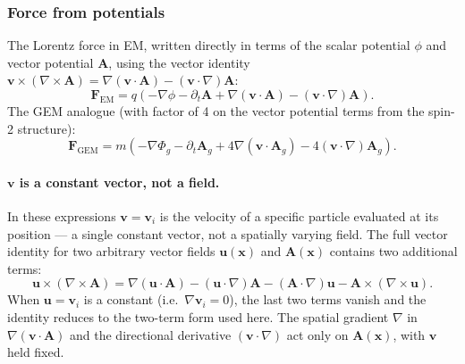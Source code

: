 \documentclass[11pt,a4paper]{article}
\newcommand{\vv}[1]{\mathbf{#1}}
\newcommand{\Phig}{\Phi_g}
\newcommand{\Ag}{\vv{A}_g}
\begin{document}
\subsubsection*{Force from potentials}
\label{sec:force_potential}

The Lorentz force in EM, written directly in terms of the scalar potential $\phi$ and vector potential $\vv{A}$, using the vector identity $\vv{v}\times(\nabla\times\vv{A}) = \nabla(\vv{v}\cdot\vv{A}) - (\vv{v}\cdot\nabla)\vv{A}$:
\begin{equation}
\label{eq:em_force_potential}
  \vv{F}_{\mathrm{EM}} = q\!\left(-\nabla\phi - \partial_t\vv{A} + \nabla(\vv{v}\cdot\vv{A}) - (\vv{v}\cdot\nabla)\vv{A}\right).
\end{equation}
The GEM analogue (with factor of 4 on the vector potential terms from the spin-2 structure):
\begin{equation}
\label{eq:gem_force_potential}
  \vv{F}_{\mathrm{GEM}} = m\!\left(-\nabla\Phig - \partial_t\Ag + 4\nabla(\vv{v}\cdot\Ag) - 4(\vv{v}\cdot\nabla)\Ag\right).
\end{equation}

\paragraph{$\vv{v}$ is a constant vector, not a field.}
In these expressions $\vv{v} = \vv{v}_i$ is the velocity of a specific particle evaluated at its position --- a single constant vector, not a spatially varying field.  The full vector identity for two arbitrary vector fields $\vv{u}(\vv{x})$ and $\vv{A}(\vv{x})$ contains two additional terms:
\begin{equation}
  \vv{u}\times(\nabla\times\vv{A}) = \nabla(\vv{u}\cdot\vv{A}) - (\vv{u}\cdot\nabla)\vv{A} - (\vv{A}\cdot\nabla)\vv{u} - \vv{A}\times(\nabla\times\vv{u}).
\end{equation}
When $\vv{u} = \vv{v}_i$ is a constant (i.e.\ $\nabla\vv{v}_i = 0$), the last two terms vanish and the identity reduces to the two-term form used here.  The spatial gradient $\nabla$ in $\nabla(\vv{v}\cdot\vv{A})$ and the directional derivative $(\vv{v}\cdot\nabla)$ act only on $\vv{A}(\vv{x})$, with $\vv{v}$ held fixed.
\end{document}
